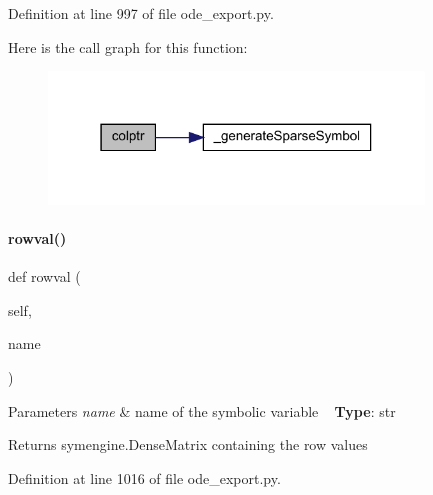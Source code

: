Definition at line 997 of file ode\+\_\+export.\+py.

Here is the call graph for this function\+:
\nopagebreak
\begin{figure}[H]
\begin{center}
\leavevmode
\includegraphics[width=283pt]{classamici_1_1ode__export_1_1_o_d_e_model_ad478875583922ae8d579486a03107557_cgraph}
\end{center}
\end{figure}
\mbox{\label{classamici_1_1ode__export_1_1_o_d_e_model_af1c1cc87fcc84bb17f41ee7fabaf795d}} 
\paragraph{\texorpdfstring{rowval()}{rowval()}}
{\footnotesize\ttfamily def rowval (\begin{DoxyParamCaption}\item[{}]{self,  }\item[{}]{name }\end{DoxyParamCaption})}


\begin{DoxyParams}{Parameters}
{\em name} & name of the symbolic variable ~\newline
{\bfseries Type}\+: str\\
\hline
\end{DoxyParams}
\begin{DoxyReturn}{Returns}
symengine.\+Dense\+Matrix containing the row values 
\end{DoxyReturn}


Definition at line 1016 of file ode\+\_\+export.\+py.

